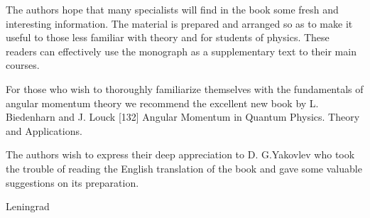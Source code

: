 The authors hope that many specialists will find in the book some fresh and interesting information. The material is prepared and arranged so as to make it useful to those less familiar with theory and for students of physics. These readers can effectively use the monograph as a supplementary text to their main courses.

For those who wish to thoroughly familiarize themselves with the fundamentals of angular momentum theory we recommend the excellent new book by L. Biedenharn and J. Louck [132] Angular Momentum in Quantum Physics. Theory and Applications.

The authors wish to express their deep appreciation to D. G.Yakovlev who took the trouble of reading the English translation of the book and gave some valuable suggestions on its preparation.

Leningrad